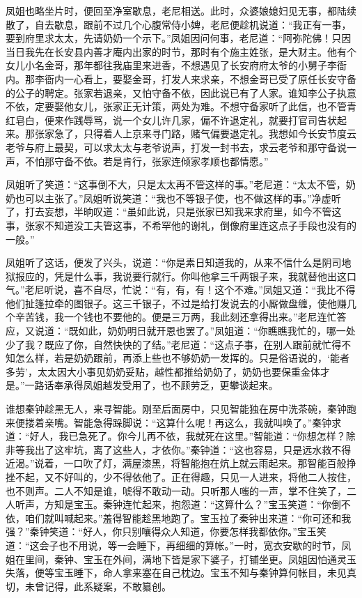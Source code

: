 \documentclass[12pt,oneside]{book}
\begin{document}
凤姐也略坐片时，便回至净室歇息，老尼相送。此时，众婆娘媳妇见无事，都陆续散了，自去歇息，跟前不过几个心腹常侍小婢，老尼便趁机说道：“我正有一事，要到府里求太太，先请奶奶一个示下。”凤姐因问何事，老尼道：“阿弥陀佛！只因当日我先在长安县内善才庵内出家的时节，那时有个施主姓张，是大财主。他有个女儿小名金哥，那年都往我庙里来进香，不想遇见了长安府府太爷的小舅子李衙内。那李衙内一心看上，要娶金哥，打发人来求亲，不想金哥已受了原任长安守备的公子的聘定。张家若退亲，又怕守备不依，因此说已有了人家。谁知李公子执意不依，定要娶他女儿，张家正无计策，两处为难。不想守备家听了此信，也不管青红皂白，便来作践辱骂，说一个女儿许几家，偏不许退定礼，就要打官司告状起来。那张家急了，只得着人上京来寻门路，赌气偏要退定礼。我想如今长安节度云老爷与府上最契，可以求太太与老爷说声，打发一封书去，求云老爷和那守备说一声，不怕那守备不依。若是肯行，张家连倾家孝顺也都情愿。”

凤姐听了笑道：“这事倒不大，只是太太再不管这样的事。”老尼道：“太太不管，奶奶也可以主张了。”凤姐听说笑道：“我也不等银子使，也不做这样的事。”净虚听了，打去妄想，半晌叹道：“虽如此说，只是张家已知我来求府里，如今不管这事，张家不知道没工夫管这事，不希罕他的谢礼，倒像府里连这点子手段也没有的一般。”

凤姐听了这话，便发了兴头，说道：“你是素日知道我的，从来不信什么是阴司地狱报应的，凭是什么事，我说要行就行。你叫他拿三千两银子来，我就替他出这口气。”老尼听说，喜不自尽，忙说：“有，有，有！这个不难。”凤姐又道：“我比不得他们扯篷拉牵的图银子。这三千银子，不过是给打发说去的小厮做盘缠，使他赚几个辛苦钱，我一个钱也不要他的。便是三万两，我此刻还拿得出来。”老尼连忙答应，又说道：“既如此，奶奶明日就开恩也罢了。”凤姐道：“你瞧瞧我忙的，哪一处少了我？既应了你，自然快快的了结。”老尼道：“这点子事，在别人跟前就忙得不知怎么样，若是奶奶跟前，再添上些也不够奶奶一发挥的。只是俗语说的，‘能者多劳’，太太因大小事见奶奶妥贴，越性都推给奶奶了，奶奶也要保重金体才是。”一路话奉承得凤姐越发受用了，也不顾劳乏，更攀谈起来。

谁想秦钟趁黑无人，来寻智能。刚至后面房中，只见智能独在房中洗茶碗，秦钟跑来便搂着亲嘴。智能急得跺脚说：“这算什么呢！再这么，我就叫唤了。”秦钟求道：“好人，我已急死了。你今儿再不依，我就死在这里。”智能道：“你想怎样？除非等我出了这牢坑，离了这些人，才依你。”秦钟道：“这也容易，只是远水救不得近渴。”说着，一口吹了灯，满屋漆黑，将智能抱在炕上就云雨起来。那智能百般挣挫不起，又不好叫的，少不得依他了。正在得趣，只见一人进来，将他二人按住，也不则声。二人不知是谁，唬得不敢动一动。只听那人嗤的一声，掌不住笑了，二人听声，方知是宝玉。秦钟连忙起来，抱怨道：“这算什么？”宝玉笑道：“你倒不依，咱们就叫喊起来。”羞得智能趁黑地跑了。宝玉拉了秦钟出来道：“你可还和我强？”秦钟笑道：“好人，你只别嚷得众人知道，你要怎样我都依你。”宝玉笑道：“这会子也不用说，等一会睡下，再细细的算帐。”一时，宽衣安歇的时节，凤姐在里间，秦钟、宝玉在外间，满地下皆是家下婆子，打铺坐更。凤姐因怕通灵玉失落，便等宝玉睡下，命人拿来塞在自己枕边。宝玉不知与秦钟算何帐目，未见真切，未曾记得，此系疑案，不敢纂创。
\end{document}
